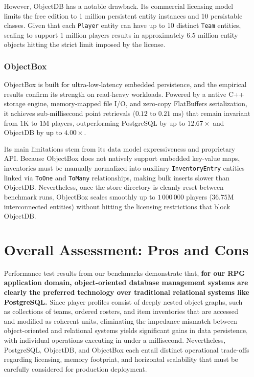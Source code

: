 \documentclass{article}
\begin{document}
However, ObjectDB has a notable drawback. Its commercial licensing model limits the free edition to 1 million persistent entity instances and 10 persistable classes. Given that each \texttt{Player} entity can have up to 10 distinct \texttt{Team} entities, scaling to support 1 million players results in approximately 6.5 million entity objects hitting the strict limit imposed by the license.

\subsubsection{ObjectBox}
ObjectBox is built for ultra-low-latency embedded persistence, and the empirical results confirm its strength on read-heavy workloads. Powered by a native C++ storage engine, memory-mapped file I/O, and zero-copy FlatBuffers serialization, it achieves sub-millisecond point retrievals ($0.12$ to $0.21\text{ ms}$) that remain invariant from $1\text{K}$ to $1\text{M}$ players, outperforming PostgreSQL by up to $12.67\times$ and ObjectDB by up to $4.00\times$.

Its main limitations stem from its data model expressiveness and proprietary API. Because ObjectBox does not natively support embedded key-value maps, inventories must be manually normalized into auxiliary \texttt{InventoryEntry} entities linked via \texttt{ToOne} and \texttt{ToMany} relationships, making bulk inserts slower than ObjectDB. Nevertheless, once the store directory is cleanly reset between benchmark runs, ObjectBox scales smoothly up to $1\,000\,000$ players ($36.75\text{M}$ interconnected entities) without hitting the licensing restrictions that block ObjectDB.

\section{Overall Assessment: Pros and Cons}
Performance test results from our benchmarks demonstrate that, \textbf{for our RPG application domain, object-oriented database management systems are clearly the preferred technology over traditional relational systems like PostgreSQL.} Since player profiles consist of deeply nested object graphs, such as collections of teams, ordered rosters, and item inventories that are accessed and modified as coherent units, eliminating the impedance mismatch between object-oriented and relational systems yields significant gains in data persistence, with individual operations executing in under a millisecond. Nevertheless, PostgreSQL, ObjectDB, and ObjectBox each entail distinct operational trade-offs regarding licensing, memory footprint, and horizontal scalability that must be carefully considered for production deployment.
\end{document}
